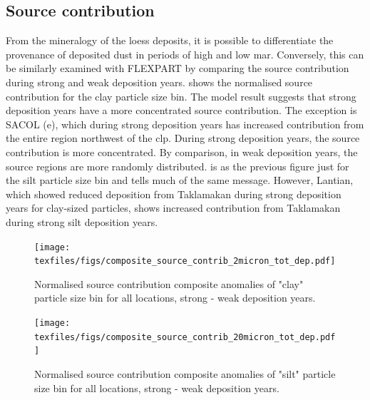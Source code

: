\subsection{Source contribution}
From the mineralogy of the loess deposits, it is possible to differentiate the provenance of deposited dust in periods of high and low \acrshort{mar}. Conversely, this can be similarly examined with FLEXPART by comparing the source contribution during strong and weak deposition years.  
 shows the normalised source contribution for the clay particle size bin. The model result suggests that strong deposition years have a more concentrated source contribution. 
The exception is SACOL (e), which during strong deposition years has increased contribution from the entire region northwest of the \acrshort{clp}. 
During strong deposition years, the source contribution is more concentrated. 
By comparison, in weak deposition years, the source regions are more randomly distributed.  is as the previous figure just for the silt particle size bin and tells much of the same message. 
However, Lantian, which showed reduced deposition from Taklamakan during strong deposition years for clay-sized particles, shows increased contribution from Taklamakan during strong silt deposition years.     
\begin{figure}[hptb]
    \centering
    \texttt{[image: texfiles/figs/composite\_source\_contrib\_2micron\_tot\_dep.pdf]}
    \caption{Normalised source contribution composite anomalies of "clay" particle size bin for all locations, strong - weak deposition years.}
    \label{fig:source_contrib2mmu_anomalies}
\end{figure}

\begin{figure}[hptb]
    \centering
    \texttt{[image: texfiles/figs/composite\_source\_contrib\_20micron\_tot\_dep.pdf]}
    \caption{Normalised source contribution composite anomalies of "silt" particle size bin for all locations, strong - weak deposition years.}
    \label{fig:source_contrib20mmu_anomalies}
\end{figure}

